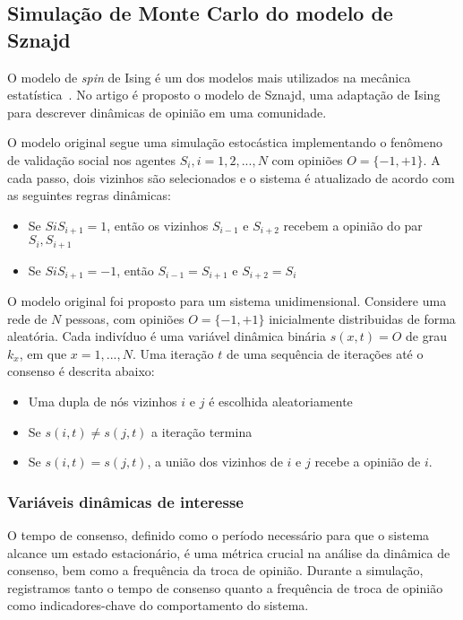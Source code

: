 \documentclass{article}
\begin{document}
\subsection{Simulação de Monte Carlo do modelo de Sznajd}
O modelo de \textit{spin} de Ising é um dos modelos mais utilizados na mecânica estatística~\cite{castellano2009social}. No artigo \cite{sznajd2000opinion} é proposto o modelo de Sznajd, uma adaptação de Ising para descrever dinâmicas de opinião em uma comunidade.

O modelo original segue uma simulação estocástica implementando o fenômeno de validação social nos agentes $S_i, i=1,2,...,N$ com opiniões $O=\{-1, +1\}$. A cada passo, dois vizinhos são selecionados e o sistema é atualizado de acordo com as seguintes regras dinâmicas:
\begin{itemize}
    \item Se $SiS_{i+1}=1$, então os vizinhos $S_{i-1}$ e $S_{i+2}$ recebem a opinião do par $S_i, S_{i+1}$ 
    \item Se $SiS_{i+1}=-1$, então $S_{i-1}=S_{i+1}$ e $S_{i+2}=S_i$  
\end{itemize}

O modelo original foi proposto para um sistema unidimensional. 
Considere uma rede de $N$ pessoas, com opiniões $O =\{-1, +1\}$ inicialmente distribuidas de forma aleatória. Cada indivíduo é uma variável dinâmica binária $s(x, t)=O$ de grau $k_x$, em que $x=1,...,N$.  Uma iteração $t$ de uma sequência de iterações até o consenso é descrita abaixo: 

\begin{itemize}
    \item Uma dupla de nós vizinhos $i$ e $j$ é escolhida aleatoriamente
    \item Se $s(i, t) \ne s(j, t)$ a iteração termina
    \item Se $s(i, t) = s(j, t)$, a união dos vizinhos de $i$ e $j$ recebe a opinião de $i$.
\end{itemize}

\subsubsection{Variáveis dinâmicas de interesse}
O tempo de consenso, definido como o período necessário para que o sistema alcance um estado estacionário, é uma métrica crucial na análise da dinâmica de consenso, bem como a frequência da troca de opinião. Durante a simulação, registramos tanto o tempo de consenso quanto a frequência de troca de opinião como indicadores-chave do comportamento do sistema.
\end{document}
